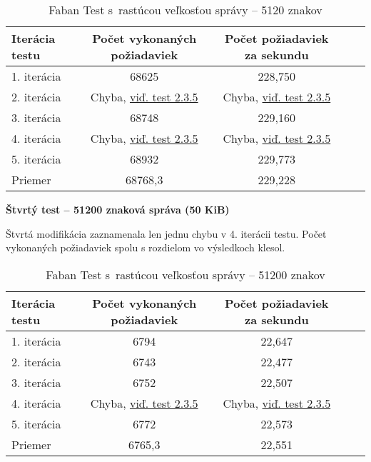 \documentclass[12pt,oneside,final]{fithesis-utf8}
\begin{document}
\begin{itemize}
\begin{table}[H]
\begin{center}
\begin{tabular}{ | l | c | c | c | c |}
		\hline
		 \textbf{Iterácia testu} & \textbf{Počet vykonaných požiadaviek} & \textbf{Počet požiadaviek za sekundu} \\ \hline
		 1. iterácia & 68625 & 228,750 \\ \hline
		 2. iterácia & Chyba, \hyperlink{label}{viď. test 2.3.5} & Chyba, \hyperlink{label}{viď. test 2.3.5} \\ \hline
		 3. iterácia & 68748 & 229,160 \\ \hline
		 4. iterácia & Chyba, \hyperlink{label}{viď. test 2.3.5} & Chyba, \hyperlink{label}{viď. test 2.3.5} \\ \hline
		 5. iterácia & 68932 & 229,773 \\ \hline
		 Priemer & 68768,3 & 229,228 \\ \hline
		 
\end{tabular}
\end{center}
\caption{Faban Test s~rastúcou veľkosťou správy -- 5120 znakov}
\end{table}


\textbf{Štvrtý test -- 51200 znaková správa (50 KiB)}

Štvrtá modifikácia zaznamenala len jednu chybu v 4. iterácii testu. Počet vykonaných požiadaviek spolu s rozdielom vo výsledkoch klesol.

\begin{table}[H]
\begin{center}
\begin{tabular}{ | l | c | c | c | c |}
		\hline
		 \textbf{Iterácia testu} & \textbf{Počet vykonaných požiadaviek} & \textbf{Počet požiadaviek za sekundu} \\ \hline
		 1. iterácia & 6794 & 22,647 \\ \hline
		 2. iterácia & 6743 & 22,477 \\ \hline
		 3. iterácia & 6752 & 22,507 \\ \hline
		 4. iterácia & Chyba, \hyperlink{label}{viď. test 2.3.5} & Chyba, \hyperlink{label}{viď. test 2.3.5} \\ \hline
		 5. iterácia & 6772 & 22,573 \\ \hline
		 Priemer & 6765,3 & 22,551 \\ \hline
		 
\end{tabular}
\end{center}
\caption{Faban Test s~rastúcou veľkosťou správy -- 51200 znakov}
\end{table}



\end{itemize}
\end{document}
